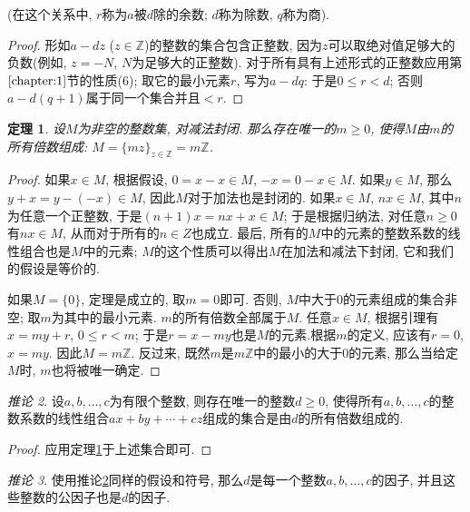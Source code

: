 \documentclass[12pt,a4paper]{book} %
\newtheorem{theorem}{定理}
\theoremstyle{remark}
\theoremstyle{example}
\theoremstyle{lemma}
\theoremstyle{corollary}
\newtheorem{corollary}[theorem]{推论}
\numberwithin{theorem}{chapter}
\begin{document}
(在这个关系中, $r$称为$a$被$d$除的余数; $d$称为除数, $q$称为商).

\begin{proof}
形如$a-dz$ ($z \in \mathbb{Z}$)的整数的集合包含正整数, 因为$z$可以取绝对值足够大的负数(例如, $z = -N$, $N$为足够大的正整数). 对于所有具有上述形式的正整数应用第$\ref{chapter:1}$节的性质(6); 取它的最小元素$r$, 写为$a - dq$: 于是$0 \le r < d$; 否则$a - d(q + 1)$属于同一个集合并且$< r$.
\end{proof}

\begin{theorem} \label{theorem:II_1}
设$M$为非空的整数集, 对减法封闭. 那么存在唯一的$m \ge 0$, 使得$M$由$m$的所有倍数组成: $M = \{mz\}_{z \in \mathbb{Z}} = m\mathbb{Z}$.
\end{theorem}

\begin{proof}
如果$x \in M$, 根据假设, $0 = x - x \in M$, $-x = 0 - x \in M$. 如果$y \in M$, 那么$y + x = y - (-x) \in M$, 因此$M$对于加法也是封闭的. 如果$x \in M$, $nx \in M$, 其中$n$为任意一个正整数, 于是$(n+1)x = nx + x \in M$; 于是根据归纳法, 对任意$n \ge 0$有$nx \in M$, 从而对于所有的$n \in Z$也成立. 最后, 所有的$M$中的元素的整数系数的线性组合也是$M$中的元素; $M$的这个性质可以得出$M$在加法和减法下封闭, 它和我们的假设是等价的.

如果$M = \{0\}$, 定理是成立的, 取$m = 0$即可. 否则, $M$中大于0的元素组成的集合非空; 取$m$为其中的最小元素. $m$的所有倍数全部属于$M$. 任意$x \in M$, 根据引理有$x = my + r$, $0 \le r < m$; 于是$r = x - my$也是$M$的元素.根据$m$的定义, 应该有$r = 0$, $x = my$. 因此$M = m\mathbb{Z}$. 反过来, 既然$m$是$m\mathbb{Z}$中的最小的大于0的元素, 那么当给定$M$时, $m$也将被唯一确定.
\end{proof}

\begin{corollary} \label{corollary:II_1}
设$a, b, \ldots, c$为有限个整数, 则存在唯一的整数$d \ge 0$, 使得所有$a, b, \ldots, c$的整数系数的线性组合$ax + by + \cdots + cz$组成的集合是由$d$的所有倍数组成的.
\end{corollary}

\begin{proof}
应用定理\ref{theorem:II_1}于上述集合即可.
\end{proof}

\begin{corollary} \label{corollary:II_2}
使用推论\ref{corollary:II_1}同样的假设和符号, 那么$d$是每一个整数$a, b, \ldots, c$的因子, 并且这些整数的公因子也是$d$的因子.
\end{corollary}
\end{document}
